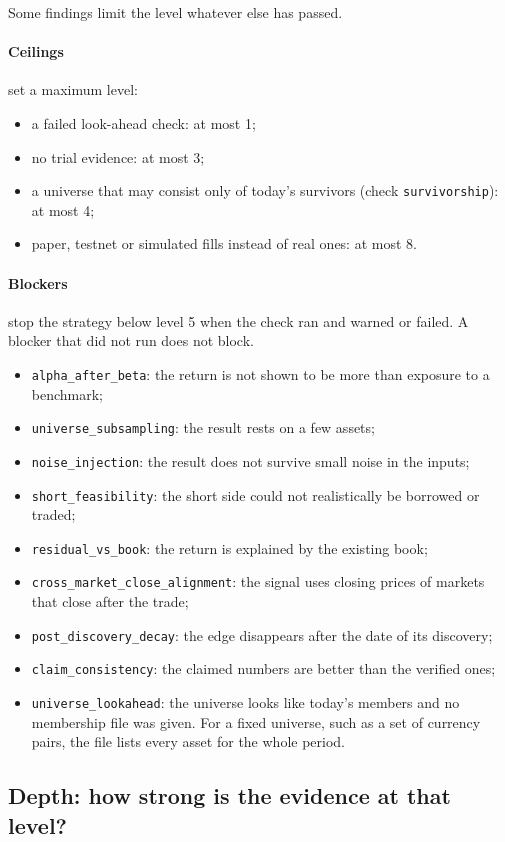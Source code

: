 \documentclass[11pt]{article}
\newcommand{\chk}[1]{\texttt{#1}}
\begin{document}
Some findings limit the level whatever else has passed.

\paragraph{Ceilings} set a maximum level:
\begin{itemize}
\item a failed look-ahead check: at most 1;
\item no trial evidence: at most 3;
\item a universe that may consist only of today's survivors (check \chk{survivorship}): at most 4;
\item paper, testnet or simulated fills instead of real ones: at most 8.
\end{itemize}

\paragraph{Blockers} stop the strategy below level 5 when the check ran and warned or failed. A blocker that did not run
does not block.
\begin{itemize}
\item \chk{alpha\_after\_beta}: the return is not shown to be more than exposure to a benchmark;
\item \chk{universe\_subsampling}: the result rests on a few assets;
\item \chk{noise\_injection}: the result does not survive small noise in the inputs;
\item \chk{short\_feasibility}: the short side could not realistically be borrowed or traded;
\item \chk{residual\_vs\_book}: the return is explained by the existing book;
\item \chk{cross\_market\_close\_alignment}: the signal uses closing prices of markets that close after the trade;
\item \chk{post\_discovery\_decay}: the edge disappears after the date of its discovery;
\item \chk{claim\_consistency}: the claimed numbers are better than the verified ones;
\item \chk{universe\_lookahead}: the universe looks like today's members and no membership file was given. For a fixed
universe, such as a set of currency pairs, the file lists every asset for the whole period.
\end{itemize}

\subsection{Depth: how strong is the evidence at that level?}\label{sec:depth}
\end{document}
